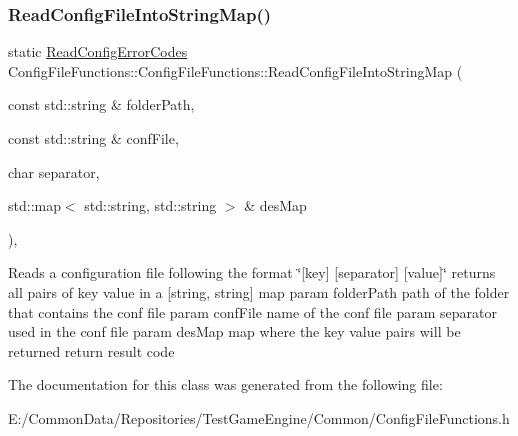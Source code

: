 \subsubsection{\texorpdfstring{ReadConfigFileIntoStringMap()}{ReadConfigFileIntoStringMap()}}
{\footnotesize\ttfamily static \mbox{\hyperlink{namespace_config_file_functions_aa7fab72913bf30fd480cb3d7dbf47518}{Read\+Config\+Error\+Codes}} Config\+File\+Functions\+::\+Config\+File\+Functions\+::\+Read\+Config\+File\+Into\+String\+Map (\begin{DoxyParamCaption}\item[{const std\+::string \&}]{folder\+Path,  }\item[{const std\+::string \&}]{conf\+File,  }\item[{char}]{separator,  }\item[{std\+::map$<$ std\+::string, std\+::string $>$ \&}]{des\+Map }\end{DoxyParamCaption})\hspace{0.3cm}{\ttfamily [inline]}, {\ttfamily [static]}}

Reads a configuration file following the format \char`\"{}\mbox{[}key\mbox{]} \mbox{[}separator\mbox{]} \mbox{[}value\mbox{]}\char`\"{} returns all pairs of key value in a \mbox{[}string, string\mbox{]} map param folder\+Path path of the folder that contains the conf file param conf\+File name of the conf file param separator used in the conf file param des\+Map map where the key value pairs will be returned return result code 

The documentation for this class was generated from the following file\+:\begin{DoxyCompactItemize}
\item 
E\+:/\+Common\+Data/\+Repositories/\+Test\+Game\+Engine/\+Common/Config\+File\+Functions.\+h\end{DoxyCompactItemize}
